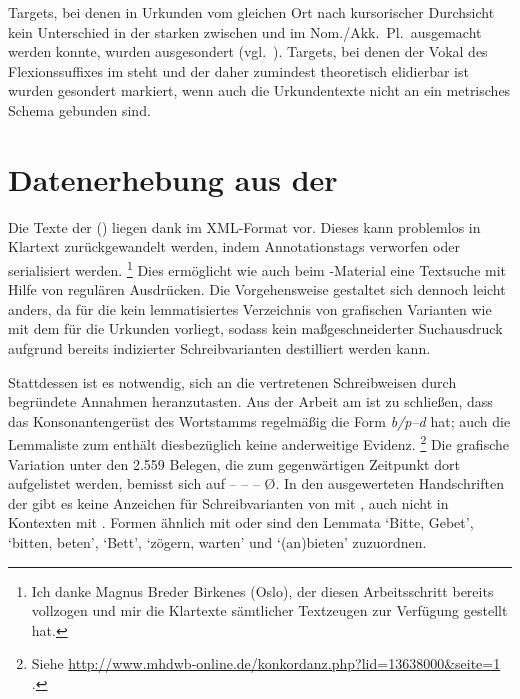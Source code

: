 Targets, bei denen in Urkunden vom gleichen Ort nach kursorischer
Durchsicht kein Unterschied in der starken  zwischen
 und  im Nom./Akk.~Pl.\ ausgemacht werden konnte, wurden
ausgesondert (vgl.~). Targets, bei denen der Vokal des
Flexionssuffixes im  steht und der daher zumindest theoretisch
elidierbar ist \autocites[vgl.][90--91]{askedal1973}[191]{gjelsten1980} wurden
gesondert markiert, wenn auch die Urkundentexte nicht an ein metrisches Schema
gebunden sind.


\section{Datenerhebung aus der }

Die Texte der  (\KC) liegen dank 
\autocite{kcdigital} im XML-Format vor. Dieses kann problemlos in Klartext
zurückgewandelt werden, indem Annotationstags verworfen oder
serialisiert werden.%
%
	\footnote{Ich danke Magnus Breder Birkenes (Oslo), der diesen
	Arbeitsschritt bereits vollzogen und mir die Klartexte sämtlicher
	Textzeugen zur Verfügung gestellt hat.}
%
Dies ermöglicht wie auch beim \CAO{}-Material eine Textsuche mit Hilfe von
regulären Ausdrücken. Die Vorgehensweise gestaltet sich
dennoch leicht anders, da für die \KC{} kein lemmatisiertes Verzeichnis von
grafischen Varianten wie mit dem \WMU{} für die Urkunden vorliegt,
sodass kein maßgeschneiderter Suchausdruck aufgrund bereits indizierter
Schreibvarianten destilliert werden kann.

Stattdessen ist es notwendig, sich an die vertretenen Schreibweisen durch
begründete Annahmen heranzutasten. Aus der Arbeit am \CAO{} ist zu schließen,
dass das Konsonantengerüst des Wortstamms regelmäßig die Form \textit{b/p--d}
hat; auch die Lemmaliste zum 
\autocite[s.\,v.~]{mwb1} enthält diesbezüglich keine anderweitige
Evidenz.%
%
	\footnote{Siehe
		\url{http://www.mhdwb-online.de/konkordanz.php?lid=13638000&seite=1}%
		.}
%
Die grafische Variation unter den 2.559 Belegen, die zum gegenwärtigen
Zeitpunkt dort aufgelistet werden, bemisst sich auf  --  --  --  Ø. In den ausgewerteten Handschriften der \KC{} gibt
es keine Anzeichen für Schreibvarianten von  mit , auch
nicht in Kontexten mit . Formen ähnlich  mit 
oder  sind den Lemmata  `Bitte, Gebet', 
`bitten, beten',  `Bett',  `zögern, warten' und
 `(an)bieten' zuzuordnen.

